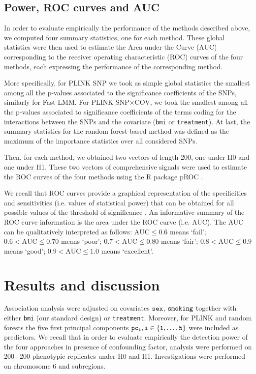 \documentclass[10pt,a4paper]{article}
\begin{document}
\subsection{Power, ROC curves and AUC}


In order to evaluate empirically the performance of the methods described above, we computed four summary statistics, one for each method. These global statistics were then used to estimate the Area under the Curve (AUC) corresponding to the receiver operating characteristic (ROC) curves of the four methods, each expressing the performance of the corresponding method. 

More specifically, for PLINK SNP we took as simple global statistics the smallest among all the p-values associated to the significance coefficients of the SNPs, similarly for Fast-LMM. For PLINK SNP$\times$COV, we took the smallest among all the p-values associated to significance coefficients of the terms coding for the interactions between the SNPs and the covariate ({\tt bmi} or {\tt treatment}). At last, the summary statistics for the random forest-based method was defined as the maximum of the importance statistics over all considered SNPs.

Then, for each method, we obtained two vectors of length 200,  one under H0 and one under H1. These two vectors of comprehensive signals were used to estimate the ROC curves of the four methods using the R package pROC \citep{robin2011proc}.

We recall that ROC curves provide a graphical representation of the specificities and sensitivities (i.e. values of statistical power) that can be obtained for all possible values of the threshold of significance \citep{metz1978basic}. An informative summary of the ROC curve information is the area under the ROC curve (i.e. AUC). The AUC can be qualitatively interpreted as follows: $\text{AUC} \leq 0.6$ means ‘fail’; $0.6 < \text{AUC} \leq 0.70$ means ‘poor’; $0.7 < \text{AUC} \leq 0.80$ means ‘fair’; $0.8 < \text{AUC} \leq 0.9$ means ‘good’; $0.9 < \text{AUC} \leq 1.0$ means ‘excellent’. 


\section{Results and discussion}

Association analysis were adjusted on covariates $\tt{sex}$, $\tt{smoking}$ together with either {\tt bmi} (our standard design) or {\tt treatment}. Moreover, for PLINK and random forests the five first principal components $\tt{pc_i, i\in \{1, \dots, 5\}}$ were included as predictors. We recall that in order to evaluate empirically the detection power of the four approaches in presence of confounding factor, analysis were performed on 200+200 phenotypic replicates under H0 and H1. Investigations were performed on chromosome 6 and subregions. 
\end{document}
